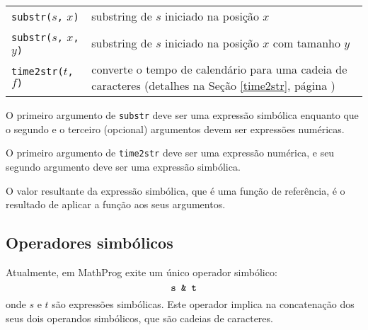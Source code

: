 \documentclass[11pt, brazil]{report}
\begin{document}
\begin{tabular}{@{}p{112pt}p{328pt}@{}}
{\tt substr(}$s${\tt,} $x${\tt)}&substring de $s$ iniciado na
posição $x$\\
{\tt substr(}$s${\tt,} $x${\tt,} $y${\tt)}&substring de $s$ iniciado
na posição $x$ com tamanho $y$\\
{\tt time2str(}$t${\tt,} $f${\tt)}&converte o tempo de calendário para
uma cadeia de caracteres \linebreak (detalhes na Seção \ref{time2str}, página
\pageref{time2str})\\
\end{tabular}


O primeiro argumento de {\tt substr} deve ser uma expressão simbólica
enquanto que o segundo e o terceiro (opcional) argumentos devem ser
expressões numéricas.

O primeiro argumento de {\tt time2str} deve ser uma expressão numérica,
e seu segundo argumento deve ser uma expressão simbólica.

O valor resultante da expressão simbólica, que é uma função de referência,
é o resultado de aplicar a função aos seus argumentos.

%
%

\subsection{Operadores simbólicos}

Atualmente, em MathProg exite um único operador simbólico:
$$\mbox{\tt s \& t}$$
onde $s$ e $t$ são expressões simbólicas. Este operador implica na
concatenação dos seus dois operandos simbólicos, que são cadeias
de caracteres.
\end{document}
